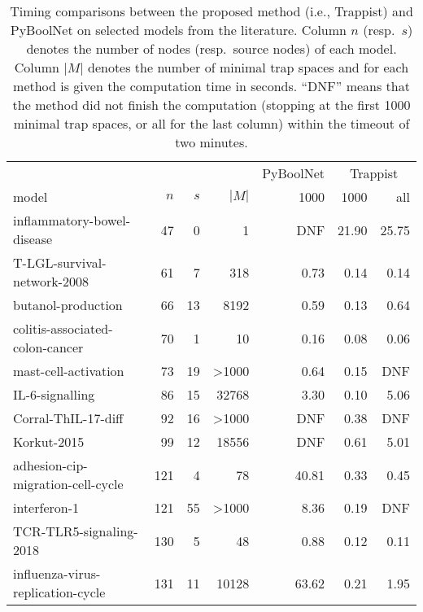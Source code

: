 \documentclass[runningheads]{llncs}
\begin{document}
\setlength{\tabcolsep}{4pt}
\begin{table}[!htb]
  \caption{Timing comparisons between the proposed method (i.e., Trappist) and PyBoolNet on selected models from the literature.
    Column \(n\) (resp.\ \(s\)) denotes the number of nodes (resp.\ source nodes) of each model. Column \(|M|\) denotes the number of minimal trap spaces and for each method is given the computation time in seconds.
    ``DNF'' means that the method did not finish the computation (stopping at the first 1000 minimal trap spaces, or all for the last column) within the timeout of two minutes.}
  \centering%
  \label{tab:result_real}
  \begin{tabular}{lrrrrrr}
    \toprule
    & & & & PyBoolNet & \multicolumn{2}{c}{Trappist} \\
    \cmidrule(lr){6-7}
    model & \(n\) & \(s\) & \(|M|\) & 1000 & 1000 & all \\
    \midrule
    inflammatory-bowel-disease~\cite{DBLP:journals/bmcsb/HelikarKMBRMWSLR12} & 47 & 0 & 1 & DNF & 21.90 & 25.75\\
    T-LGL-survival-network-2008~\cite{DBLP:journals/bmcsb/HelikarKMBRMWSLR12} & 61 & 7 & 318 & 0.73 & 0.14 & 0.14\\
    butanol-production~\cite{DBLP:journals/bmcsb/HelikarKMBRMWSLR12} & 66 & 13 & 8192 & 0.59 & 0.13 & 0.64\\
    colitis-associated-colon-cancer~\cite{DBLP:journals/bmcsb/HelikarKMBRMWSLR12} & 70 & 1 & 10 & 0.16 & 0.08 & 0.06\\
    mast-cell-activation~\cite{aghamiri2020automated} & 73 & 19 & >1000 & 0.64 & 0.15 & DNF\\
    IL-6-signalling~\cite{DBLP:journals/bmcsb/HelikarKMBRMWSLR12} & 86 & 15 & 32768 & 3.30 & 0.10 & 5.06\\
    Corral-ThIL-17-diff~\cite{corral2021interplay} & 92 & 16 & >1000 & DNF & 0.38 & DNF\\
    Korkut-2015~\cite{lee2019signal} & 99 & 12 & 18556 & DNF & 0.61 & 5.01\\ \midrule
    adhesion-cip-migration-cell-cycle~\cite{guberman2020boolean} & 121 & 4 & 78 & 40.81 & 0.33 & 0.45\\
    interferon-1~\cite{ostaszewski2021covid19} & 121 & 55 & >1000 & 8.36 & 0.19 & DNF\\
    TCR-TLR5-signaling-2018~\cite{rodriguez2019cooperation} & 130 & 5 & 48 & 0.88 & 0.12 & 0.11\\
    influenza-virus-replication-cycle~\cite{DBLP:journals/bmcsb/HelikarKMBRMWSLR12} & 131 & 11 & 10128 & 63.62 & 0.21 & 1.95\\

\end{tabular}
\end{table}
\end{document}
